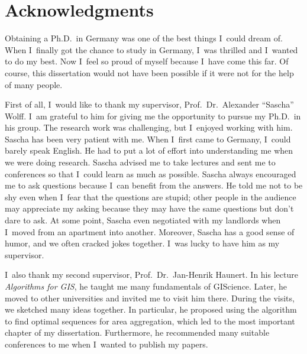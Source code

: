 
\chapter*{Acknowledgments}%
%

Obtaining a Ph.D.\ in Germany was 
one of the best things I~could dream of.
When I~finally got the chance to study in Germany,
I~was thrilled and I~wanted to do my best.
Now I~feel so proud of myself because I~have come this far.
Of course, this dissertation would not have been possible
if it were not for the help of many people.

First of all, I~would like to thank my supervisor, 
Prof.\ Dr.\ Alexander ``Sascha'' Wolff.
I~am grateful to him for giving me 
the opportunity to pursue my Ph.D.\ in his group.
The research work was challenging,
but I~enjoyed working with him.
Sascha has been very patient with me.
When I~first came to Germany, I~could barely speak English.
He had to put a lot of effort into understanding me
when we were doing research.
Sascha advised me to take lectures and sent me to conferences
so that I~could learn as much as possible.
Sascha always encouraged me to ask questions
because I~can benefit from the answers.
He told me not to be shy even when 
I~fear that the questions are stupid;
other people in the audience may appreciate my asking
because they may have the same questions
but don't dare to ask.
At some point,
Sascha even negotiated with my landlords 
when I~moved from an apartment into another.
Moreover, Sascha has a good sense of humor, 
and we often cracked jokes together.
I~was lucky to have him as my supervisor.

I~also thank my second supervisor, 
Prof.\ Dr.\ Jan-Henrik Haunert.  
In his lecture \emph{Algorithms for GIS}, 
he taught me many fundamentals of GIScience.  
Later, he moved to other universities 
and invited me to visit him there.
During the visits, we sketched many ideas together.
In particular, he proposed %
using the \Astar algorithm 
to find optimal sequences for area aggregation,
which led to the most important chapter of my dissertation.
Furthermore, he recommended many suitable conferences to me
when I~wanted to publish my papers.

